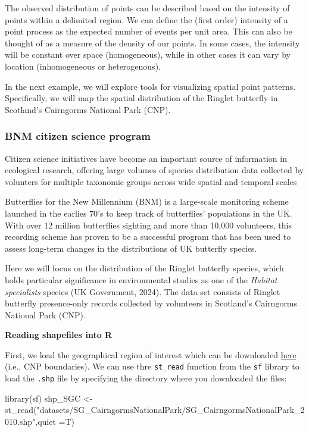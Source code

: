 \documentclass[
  letterpaper,
  DIV=11,
  numbers=noendperiod]{scrartcl}
\newenvironment{Shaded}{\begin{snugshade}}{\end{snugshade}}
\newcommand{\AttributeTok}[1]{\textcolor[rgb]{0.40,0.45,0.13}{#1}}
\newcommand{\FunctionTok}[1]{\textcolor[rgb]{0.28,0.35,0.67}{#1}}
\newcommand{\NormalTok}[1]{\textcolor[rgb]{0.00,0.23,0.31}{#1}}
\newcommand{\OtherTok}[1]{\textcolor[rgb]{0.00,0.23,0.31}{#1}}
\newcommand{\StringTok}[1]{\textcolor[rgb]{0.13,0.47,0.30}{#1}}
\begin{document}
The observed distribution of points can be described based on the
intensity of points within a delimited region. We can define the (first
order) intensity of a point process as the expected number of events per
unit area. This can also be thought of as a measure of the density of
our points. In some cases, the intensity will be constant over space
(homogeneous), while in other cases it can vary by location
(inhomogeneous or heterogenous).

In the next example, we will explore tools for visualizing spatial point
patterns. Specifically, we will map the spatial distribution of the
Ringlet butterfly in Scotland's Cairngorms National Park (CNP).

\subsubsection{BNM citizen science
program}\label{bnm-citizen-science-program}

Citizen science initiatives have become an important source of
information in ecological research, offering large volumes of species
distribution data collected by volunters for multiple taxonomic groups
across wide spatial and temporal scales

Butterflies for the New Millennium (BNM) is a large-scale monitoring
scheme launched in the earlies 70's to keep track of butterflies'
populations in the UK. With over 12 million butterflies sighting and
more than 10,000 volunteers, this recording scheme has proven to be a
successful program that has been used to assess long-term changes in the
distributions of UK butterfly species.

Here we will focus on the distribution of the Ringlet butterfly species,
which holds particular significance in environmental studies as one of
the \emph{Habitat specialists} species (UK Government, 2024). The data
set consists of Ringlet butterfly presence-only records collected by
volunteers in Scotland's Cairngorms National Park (CNP).

\textbf{Reading shapefiles into R}

First, we load the geographical region of interest which can be
downloaded
\href{https://maps.gov.scot/ATOM/shapefiles/SG_CairngormsNationalPark_2010.zip}{here}
(i.e., CNP boundaries). We can use thre \texttt{st\_read} function from
the \texttt{sf} library to load the \texttt{.shp} file by specifying the
directory where you downloaded the files:

\begin{Shaded}
\begin{Highlighting}[]
\FunctionTok{library}\NormalTok{(sf)}
\NormalTok{shp\_SGC }\OtherTok{\textless{}{-}}  \FunctionTok{st\_read}\NormalTok{(}\StringTok{"datasets/SG\_CairngormsNationalPark/SG\_CairngormsNationalPark\_2010.shp"}\NormalTok{,}\AttributeTok{quiet =}\NormalTok{T)}
\end{Highlighting}
\end{Shaded}
\end{document}
